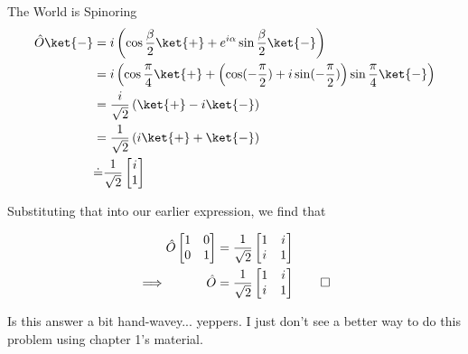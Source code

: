 \begin{answer}
\begin{answerpart}{The World is Spinoring}
    \begin{equation}
      \begin{split}
        \hat{O}\ket{-}
        &= i
        \left(
        \cos{\frac{\beta}{2}} \ket{+} + e^{i\alpha}\sin{\frac{\beta}{2}} \ket{-}
        \right)
        \\
        &= i
        \left(\cos{\frac{\pi}{4}} \ket{+} + \left(\cos(-\frac{\pi}{2}) + i\sin(-\frac{\pi}{2})\right)\sin{\frac{\pi}{4}} \ket{-}
        \right)
        \\
        &= \frac{i}{\sqrt{2}}
        \left(\ket{+} - i\ket{-}\right)
        \\
        &= \frac{1}{\sqrt{2}}
        \left(i\ket{+} + \ket{-}\right)
        \\
        &\dot{=} \frac{1}{\sqrt{2}}
        \begin{bmatrix}
          i\\1\\
        \end{bmatrix}
        \\
      \end{split}
    \end{equation}

    Substituting that into our earlier expression, we find that

    \begin{equation}
      \begin{alignedat}{2}
        &&\hat{O}
        \begin{bmatrix}
          1 & 0\\ 0 & 1\\
        \end{bmatrix}
        &=
        \frac{1}{\sqrt{2}}
        \begin{bmatrix}
          1 & i\\ i & 1\\
        \end{bmatrix}
        \\
        \implies&& \hat{O}
        &=
        \frac{1}{\sqrt{2}}
        \begin{bmatrix}
          1 & i\\ i & 1\\
        \end{bmatrix}\qed
        \\
      \end{alignedat}
    \end{equation}

    Is this answer a bit hand-wavey... yeppers.  I just don't see a
    better way to do this problem using chapter 1's material.
  \end{answerpart}


\end{answer}
